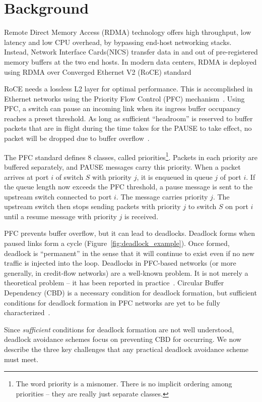 \section{Background}
\label{sec:background}
 Remote Direct Memory Access (RDMA) technology offers high
throughput, low latency and low CPU overhead, by bypassing end-host networking
stacks. Instead, Network Interface Cards(NICS) transfer data in and out of
pre-registered memory buffers at the two end hosts.  In modern data centers,
RDMA is deployed using RDMA over Converged Ethernet V2 (RoCE)
standard~\cite{roce,rroce}

 RoCE needs a lossless L2 layer for optimal performance. This is
accomplished in Ethernet networks using the Priority Flow Control (PFC)
mechanism~\cite{pfc}.  Using PFC, a switch can pause an incoming link when its
ingress buffer occupancy reaches a preset threshold. As long as sufficient
``headroom'' is reserved to buffer packets that are in flight during the time
takes for the PAUSE to take effect, no packet will be dropped due to buffer
overflow~\cite{cisco-whitepaper,dcqcn}. 

The PFC standard defines 8 classes, called priorities\footnote{The word priority
is a misnomer. There is no implicit ordering among priorities -- they are really
just separate classes.}. Packets in each priority are buffered separately, and
PAUSE messages carry this priority.  When a packet arrives at port $i$ of switch
$S$ with priority $j$, it is enqueued in queue $j$ of port $i$. If the queue
length now exceeds the PFC threshold, a pause message is sent to the upstream
switch connected to port $i$. The message carries priority $j$. The upstream
switch then stops sending packets with priority $j$ to switch $S$ on port $i$
until a resume message with priority $j$ is received.

 PFC prevents buffer overflow, but it can lead to deadlocks.
Deadlock forms when paused links form a cycle
(Figure~\ref{fig:deadlock_example}). Once formed, deadlock is ``permanent'' in
the sense that it will continue to exist even if no new traffic is injected into
the loop. Deadlocks in PFC-based networks (or more generally, in credit-flow
networks) are a well-known problem. It is not merely a theoretical problem -- it
has been reported in practice~\cite{rdmaatscale}.  Circular Buffer Dependency
(CBD) is a necessary condition for deadlock formation, but sufficient conditions
for deadlock formation in PFC networks are yet to be fully
characterized~\cite{hu2016deadlocks}. 

 Since {\em sufficient} conditions for deadlock
formation are not well understood, deadlock avoidance schemes focus on
preventing CBD for occurring. We now describe the three key challenges that any
practical deadlock avoidance scheme must meet.


